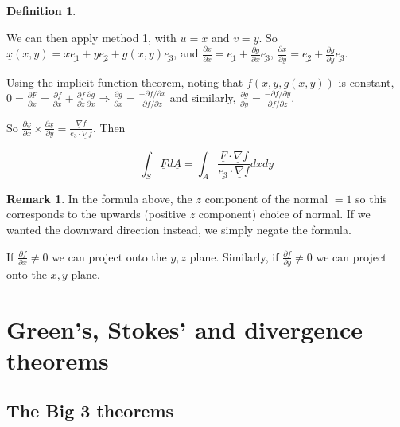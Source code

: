 \documentclass[12pt,a4paper]{article}
\theoremstyle{definition}
\newtheorem{definition}{Definition}[subsection]
\newtheorem*{remark}{Remark}
\begin{document}
\begin{definition}
\begin{enumerate}
		We can then apply method 1, with $u = x$ and $v = y$. So $\underline{x}(x, y) = x \underline{e_1} + y \underline{e_2} + g(x, y) \underline{e_3}$, and $\frac{\partial \underline{x}}{\partial x} = \underline{e_1} + \frac{\partial g}{\partial x} \underline{e_3}$, $\frac{\partial \underline{x}}{\partial y} = \underline{e_2} + \frac{\partial g}{\partial y} \underline{e_3}$.

		Using the implicit function theorem, noting that $f(x, y, g(x, y))$ is constant, $0 = \frac{\partial F}{\partial x} = \frac{\partial f}{\partial x} + \frac{\partial f}{\partial z} \frac{\partial g}{\partial x} \Rightarrow \frac{\partial g}{\partial x} = \frac{-\partial f / \partial x}{\partial f / \partial z}$ and similarly, $\frac{\partial g}{\partial y} = \frac{-\partial f / \partial y}{\partial f / \partial z}$.

		So $\frac{\partial \underline{x}}{\partial x} \times \frac{\partial \underline{x}}{\partial y} = \frac{\underline{\nabla}f}{\underline{e_3} \cdot \underline{\nabla}f}$. Then

		\[ \int_S \underline{F} d\underline{A} = \int_A \frac{\underline{F} \cdot \underline{\nabla}f}{\underline{e_3} \cdot \underline{\nabla}f} dx dy \]
	\end{enumerate}
\end{definition}

\begin{remark}
	In the formula above, the $z$ component of the normal $= 1$ so this corresponds to the upwards (positive $z$ component) choice of normal. If we wanted the downward direction instead, we simply negate the formula.

	If $\frac{\partial f}{\partial x} \ne 0$ we can project onto the $y, z$ plane. Similarly, if $\frac{\partial f}{\partial y} \ne 0$ we can project onto the $x, y$ plane.
\end{remark}

\section{Green's, Stokes' and divergence theorems}

\subsection{The Big 3 theorems}
\end{document}
